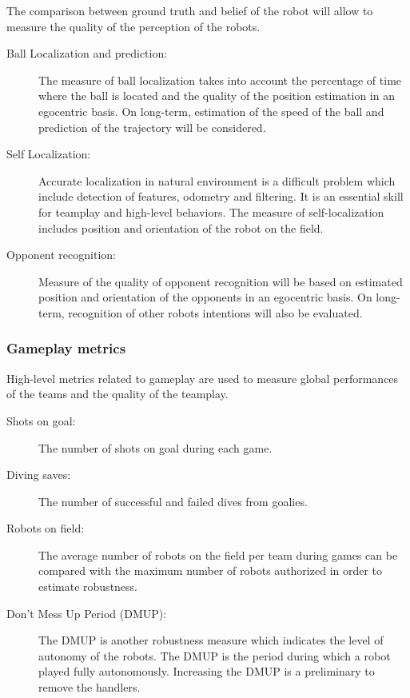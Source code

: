 \documentclass{article}
\begin{document}
The comparison between ground truth and belief of the robot will allow to measure
the quality of the perception of the robots.

\begin{description}
\item[Ball Localization and prediction:] The measure of ball localization takes
  into account the percentage of time where the ball is located and the
  quality of the position estimation in an egocentric basis.
  On long-term, estimation of the speed of the ball and prediction of the trajectory will
  be considered.
\item[Self Localization:] Accurate localization in natural environment is a
  difficult problem which include detection of features, odometry and filtering.
  It is an essential skill for teamplay and high-level behaviors.
  The measure of self-localization includes position and orientation of the robot
  on the field.
\item[Opponent recognition:] Measure of the quality of opponent recognition will
  be based on estimated position and orientation of the opponents in an egocentric
  basis.
  On long-term, recognition of other robots intentions will also be evaluated.
\end{description}

\subsubsection{Gameplay metrics}

High-level metrics related to gameplay are used to measure global performances
of the teams and the quality of the teamplay.

\begin{description}
\item[Shots on goal:] The number of shots on goal during each game.
\item[Diving saves:] The number of successful and failed dives from goalies.
\item[Robots on field:] The average number of robots on the field per team
  during games can be compared with the maximum number of robots authorized
  in order to estimate robustness.
\item[Don't Mess Up Period (DMUP):] The DMUP is another robustness measure which indicates the
  level of autonomy of the robots.
  The DMUP is the period during which a robot played fully autonomously.
  Increasing the DMUP is a preliminary to remove the handlers.
\end{description}
\end{document}
